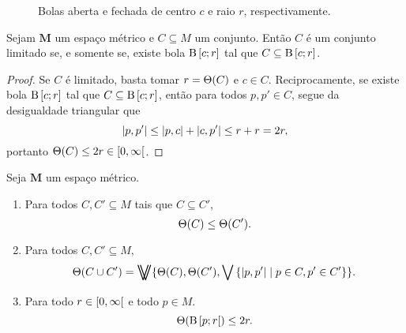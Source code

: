 \begin{figure}
\centering
{}\hspace{3cm}
\caption{Bolas aberta e fechada de centro $c$ e raio $r$, respectivamente.}
\end{figure}

\begin{proposition}
Sejam $\bm M$ um espaço métrico e $C \subseteq M$ um conjunto. Então $C$ é um conjunto limitado se, e somente se, existe bola $\mathrm{B}\left[{c};{r}\right]$ tal que $C \subseteq \mathrm{B}\left[{c};{r}\right]$.
\end{proposition}
\begin{proof}
Se $C$ é limitado, basta tomar $r=\Theta(C)$ e $c \in C$. Reciprocamente, se existe bola $\mathrm{B}\left[{c};{r}\right]$ tal que $C \subseteq \mathrm{B}\left[{c};{r}\right]$, então para todos $p,p' \in C$, segue da desigualdade triangular que
	\begin{equation*}
	\left\vert{p},{p'}\right\vert \leq \left\vert{p},{c}\right\vert+\left\vert{c},{p'}\right\vert \leq r+r=2r,
	\end{equation*}
portanto $\Theta(C) \leq 2r \in \left[{0},{\infty}\right[$.
\end{proof}

\begin{exercise}
Seja $\bm M$ um espaço métrico. 
	\begin{enumerate}
	\item Para todos $C,C' \subseteq M$ tais que $C \subseteq C'$,
		\begin{equation*}
		\Theta(C) \leq \Theta (C').
		\end{equation*}
	
	\item Para todos $C, C' \subseteq M$,
		\begin{equation*}
		\diam(C \cup C') = \max \{ \diam(C),\diam(C'),\sup\set{\dist{p}{p'}}{p \in C, p' \in C'} \}.
		\end{equation*}
	
	
	\item Para todo $r \in \left[{0},{\infty}\right[$ e todo $p \in M$.
	\begin{equation*}
	\Theta(\mathrm{B}\left[{p};{r}\right[) \leq 2r.
	\end{equation*}
	\end{enumerate}
\end{exercise}


